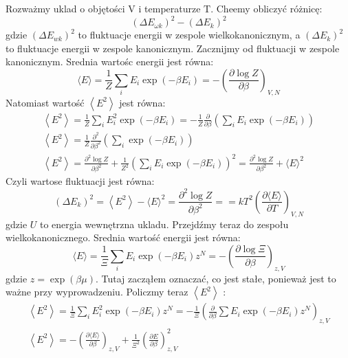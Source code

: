 \documentclass[12pt,a4paper]{article}
\begin{document}
Rozważmy uklad o objętości $\mathrm{V}$ i temperaturze $\mathrm{T}$. Cheemy obliczyć różnicę:
$$
\left(\Delta E_{\omega k}\right)^{2}-\left(\Delta E_{k}\right)^{2}
$$
gdzie $\left(\Delta E_{w k}\right)^{2}$ to fluktuacje energii w zespole wielkokanonicznym, a $\left(\Delta E_{k}\right)^{2}$ to fluktuacje energii w zespole kanonicznym. Zacznijmy od fluktuacji w zespole kanonicznym. Srednia wartośc energii jest równa:
$$
\langle E\rangle=\frac{1}{Z} \sum_{i} E_{i} \exp \left(-\beta E_{i}\right)=-\left(\frac{\partial \log Z}{\partial \beta}\right)_{V, N}
$$
Natomiast wartość $\left\langle E^{2}\right\rangle$ jest równa:
$$
\begin{gathered}
\left\langle E^{2}\right\rangle=\frac{1}{Z} \sum_{i} E_{i}^{2} \exp \left(-\beta E_{i}\right)=-\frac{1}{Z} \frac{\partial}{\partial \beta}\left(\sum_{i} E_{i} \exp \left(-\beta E_{i}\right)\right) \\
\left\langle E^{2}\right\rangle=\frac{1}{Z} \frac{\partial^{2}}{\partial \beta^{2}}\left(\sum_{i} \exp \left(-\beta E_{i}\right)\right) \\
\left\langle E^{2}\right\rangle=\frac{\partial^{2} \log Z}{\partial \beta^{2}}+\frac{1}{Z^{2}}\left(\sum_{i} E_{i} \exp \left(-\beta E_{i}\right)\right)^{2}=\frac{\partial^{2} \log Z}{\partial \beta^{2}}+\langle E\rangle^{2}
\end{gathered}
$$
Czyli wartose fluktuacji jest równa:
$$
\left(\Delta E_{k}\right)^{2}=\left\langle E^{2}\right\rangle-\langle E\rangle^{2}=\frac{\partial^{2} \log Z}{\partial \beta^{2}}==k T^{2}\left(\frac{\partial\langle E\rangle}{\partial T}\right)_{V, N}
$$
gdzie $U$ to energia wewnętrzna ukladu. Przejdźmy teraz do zespołu wielkokanonicznego.
Srednia wartość energii jest równa:
$$
\langle E\rangle=\frac{1}{\Xi} \sum_{i} E_{i} \exp \left(-\beta E_{i}\right) z^{N}=-\left(\frac{\partial \log \Xi}{\partial \beta}\right)_{z, V}
$$
gdzie $z=\exp (\beta \mu)$. Tutaj zacząłem oznaczać, co jest stałe, ponieważ jest to ważne przy wyprowadzeniu. Policzmy teraz $\left\langle E^{2}\right\rangle$ :
$$
\begin{gathered}
\left\langle E^{2}\right\rangle=\frac{1}{\Xi} \sum_{i} E_{i}^{2} \exp \left(-\beta E_{i}\right) z^{N}=-\frac{1}{\Xi}\left(\frac{\partial}{\partial \beta} \sum E_{i} \exp \left(-\beta E_{i}\right) z^{N}\right)_{z, V} \\
\left\langle E^{2}\right\rangle=-\left(\frac{\partial\langle E\rangle}{\partial \beta}\right)_{z, V}+\frac{1}{\Xi^{2}}\left(\frac{\partial E}{\partial \beta}\right)_{z, V}^{2}
\end{gathered}
$$
\end{document}
